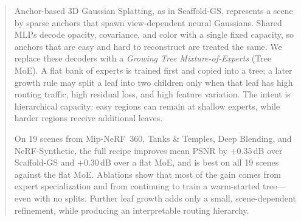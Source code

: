 \begin{abstract}
Anchor-based 3D Gaussian Splatting, as in Scaffold-GS, represents a scene by sparse anchors that spawn view-dependent neural Gaussians.
Shared MLPs decode opacity, covariance, and color with a single fixed capacity, so anchors that are easy and hard to reconstruct are treated the same.
We replace these decoders with a \emph{Growing Tree Mixture-of-Experts} (Tree MoE).
A flat bank of experts is trained first and copied into a tree; a later growth rule may split a leaf into two children only when that leaf has high routing traffic, high residual loss, and high feature variation.
The intent is hierarchical capacity: easy regions can remain at shallow experts, while harder regions receive additional leaves.

On 19 scenes from Mip-NeRF~360, Tanks \& Temples, Deep Blending, and NeRF-Synthetic, the full recipe improves mean PSNR by $+0.35$\,dB over Scaffold-GS and $+0.30$\,dB over a flat MoE, and is best on all 19 scenes against the flat MoE.
Ablations show that most of the gain comes from expert specialization and from continuing to train a warm-started tree---even with no splits.
Further leaf growth adds only a small, scene-dependent refinement, while producing an interpretable routing hierarchy.
\end{abstract}
